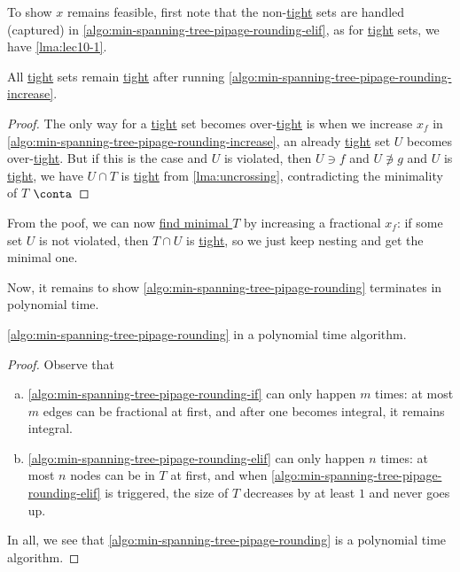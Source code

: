 To show \(x\) remains feasible, first note that the non-\hyperref[not:tight]{tight} sets are handled (captured) in \autoref{algo:min-spanning-tree-pipage-rounding-elif}, as for \hyperref[not:tight]{tight} sets, we have \autoref{lma:lec10-1}.

\begin{lemma}\label{lma:lec10-1}
	All \hyperref[not:tight]{tight} sets remain \hyperref[not:tight]{tight} after running \autoref{algo:min-spanning-tree-pipage-rounding-increase}.
\end{lemma}
\begin{proof}
	The only way for a \hyperref[not:tight]{tight} set becomes over-\hyperref[not:tight]{tight} is when we increase \(x_f\) in \autoref{algo:min-spanning-tree-pipage-rounding-increase}, an already \hyperref[not:tight]{tight} set \(U\) becomes over-\hyperref[not:tight]{tight}. But if this is the case and \(U\) is violated, then \(U\ni f\) and \(U\not\ni g\) and \(U\) is \hyperref[not:tight]{tight}, we have \(U \cap T\) is \hyperref[not:tight]{tight} from \autoref{lma:uncrossing}, contradicting the minimality of \(T\) \(\conta\)
\end{proof}
\begin{remark}\label{rmk:lec10-1}
	From the poof, we can now \hyperref[algo:min-spanning-tree-pipage-rounding-min-tight-set]{find minimal \(T\)} by increasing a fractional \(x_f\): if some set \(U\) is not violated, then \(T \cap U\) is \hyperref[not:tight]{tight}, so we just keep nesting and get the minimal one.
\end{remark}

Now, it remains to show \autoref{algo:min-spanning-tree-pipage-rounding} terminates in polynomial time.

\begin{lemma}\label{lma:lec10-2}
	\autoref{algo:min-spanning-tree-pipage-rounding} in a polynomial time algorithm.
\end{lemma}
\begin{proof}
	Observe that
	\begin{enumerate}[(a)]
		\item \autoref{algo:min-spanning-tree-pipage-rounding-if} can only happen \(m\) times: at most \(m\) edges can be fractional at first, and after one becomes integral, it remains integral.
		\item \autoref{algo:min-spanning-tree-pipage-rounding-elif} can only happen \(n\) times: at most \(n\) nodes can be in \(T\) at first, and when \autoref{algo:min-spanning-tree-pipage-rounding-elif} is triggered, the size of \(T\) decreases by at least \(1\) and never goes up.
	\end{enumerate}
	In all, we see that \autoref{algo:min-spanning-tree-pipage-rounding} is a polynomial time algorithm.
\end{proof}

